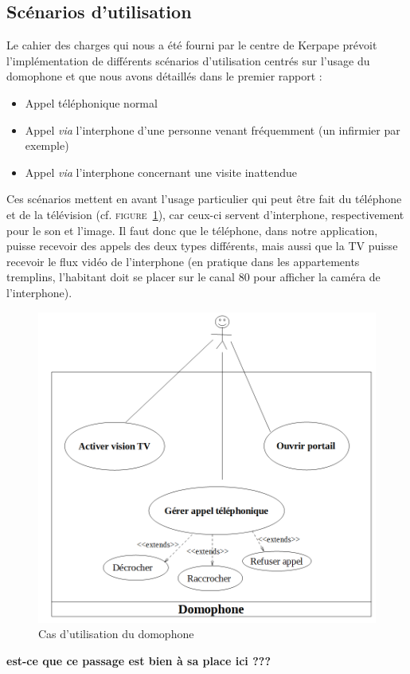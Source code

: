 \subsection{Scénarios d'utilisation}
Le cahier des charges qui nous a été fourni par le centre de Kerpape prévoit l'implémentation de différents scénarios d'utilisation centrés sur l'usage du domophone et que nous avons détaillés dans le premier rapport :
\begin{itemize}\renewcommand{\labelitemi}{$\bullet$}
\item Appel téléphonique normal
\item Appel \textit{via} l'interphone d'une personne venant fréquemment (un infirmier par exemple)
\item Appel \textit{via} l'interphone concernant une visite inattendue 
\end{itemize}
Ces scénarios mettent en avant l'usage particulier qui peut être fait du téléphone et de la télévision (cf. \textsc{figure~\ref{domophone}}), car ceux-ci servent d'interphone, respectivement pour le son et l'image. Il faut donc que le téléphone, dans notre application, puisse recevoir des appels des deux types différents, mais aussi que la TV puisse recevoir le flux vidéo de l'interphone (en pratique dans les appartements tremplins, l'habitant doit se placer sur le canal 80 pour afficher la caméra de l'interphone). 
\begin{figure}[h]
  \caption{Cas d'utilisation du domophone}
  \label{domophone}
  \includegraphics[scale=0.5,bb=0 0 720 720]{2-Specifications/img-utilisateur/use_case_diag.PNG}
\end{figure}
\textbf{est-ce que ce passage est bien à sa place ici ???}

